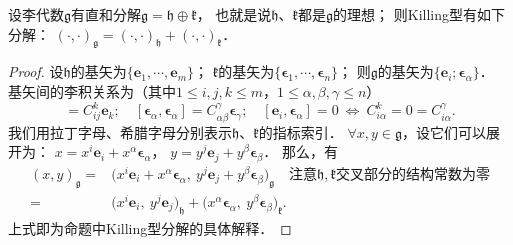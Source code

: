 \begin{proposition}\label{chlg:thm_Killing-oplus}
    设李代数$\mathfrak{g}$有直和分解$\mathfrak{g}=\mathfrak{h}\oplus\mathfrak{k}$，
    也就是说$\mathfrak{h}$、$\mathfrak{k}$都是$\mathfrak{g}$的理想；
    则Killing型有如下分解：
    $(\cdot,\cdot)_{\mathfrak{g}}=(\cdot,\cdot)_{\mathfrak{h}}+(\cdot,\cdot)_{\mathfrak{k}}$．
\end{proposition}
\begin{proof}
    设$\mathfrak{h}$的基矢为$\{\boldsymbol{e}_1,\cdots,\boldsymbol{e}_m\}$；
    $\mathfrak{k}$的基矢为$\{\boldsymbol{\epsilon}_1,\cdots,\boldsymbol{\epsilon}_n\}$；
    则$\mathfrak{g}$的基矢为$\{\boldsymbol{e}_i;\boldsymbol{\epsilon}_\alpha\}$．
    基矢间的李积关系为（其中$1\leqslant i,j,k \leqslant m$，$1\leqslant \alpha,\beta,\gamma \leqslant n$）
    \begin{equation*}
        [\boldsymbol{e}_i,\boldsymbol{e}_j]=C_{ij}^k \boldsymbol{e}_k;\quad
        [\boldsymbol{\epsilon}_\alpha,\boldsymbol{\epsilon}_\alpha]=C_{\alpha\beta}^\gamma \boldsymbol{\epsilon}_\gamma;\quad
        [\boldsymbol{e}_i,\boldsymbol{\epsilon}_\alpha]=0   \  \Leftrightarrow \ 
        C_{i\alpha}^k=0=C_{i\alpha}^\gamma.
    \end{equation*}
    我们用拉丁字母、希腊字母分别表示$\mathfrak{h}$、$\mathfrak{k}$的指标索引．
    $\forall x,y \in \mathfrak{g}$，设它们可以展开为：
    $x= x^i \boldsymbol{e}_i + x^\alpha \boldsymbol{\epsilon}_\alpha$，
    $y= y^j \boldsymbol{e}_j + y^\beta \boldsymbol{\epsilon}_\beta$．
    那么，有
    \begin{align*}
        (x,y)_{\mathfrak{g}}=& \bigl(x^i \boldsymbol{e}_i + x^\alpha \boldsymbol{\epsilon}_\alpha,\ 
         y^j \boldsymbol{e}_j + y^\beta \boldsymbol{\epsilon}_\beta\bigr)_{\mathfrak{g}}\quad
         \text{注意}\mathfrak{h},\mathfrak{k}\text{交叉部分的结构常数为零}\\
         =&\bigl(x^i\boldsymbol{e}_i ,\ y^j\boldsymbol{e}_j \bigr)_{\mathfrak{h}}
         + \bigl(x^\alpha\boldsymbol{\epsilon}_\alpha,\ y^\beta\boldsymbol{\epsilon}_\beta\bigr)_{\mathfrak{k}} .
    \end{align*}
    上式即为命题中Killing型分解的具体解释．
\end{proof}


